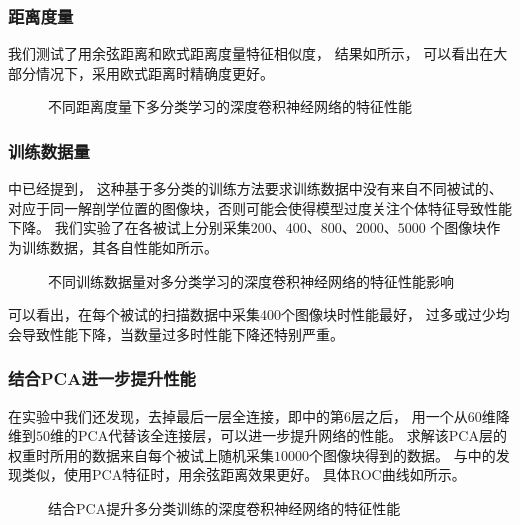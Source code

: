 \subsubsection{距离度量}
我们测试了用余弦距离和欧式距离度量特征相似度，
结果如所示，
可以看出在大部分情况下，采用欧式距离时精确度更好。

\begin{figure}[h!]
    \caption{不同距离度量下多分类学习的深度卷积神经网络的特征性能}
    \label{fig:expr:curve:clsfy:measure}
\end{figure}

\subsubsection{训练数据量}
中已经提到，
这种基于多分类的训练方法要求训练数据中没有来自不同被试的、
对应于同一解剖学位置的图像块，否则可能会使得模型过度关注个体特征导致性能下降。
我们实验了在各被试上分别采集$200$、$400$、$800$、$2000$、$5000$
个图像块作为训练数据，其各自性能如所示。
\begin{figure}[h!]
    \caption{不同训练数据量对多分类学习的深度卷积神经网络的特征性能影响}
    \label{fig:expr:curve:clsfy:datasize}
\end{figure}

可以看出，在每个被试的扫描数据中采集$400$个图像块时性能最好，
过多或过少均会导致性能下降，当数量过多时性能下降还特别严重。

\subsubsection{结合PCA进一步提升性能\label{sec:expr:clsfy:pca}}
在实验中我们还发现，去掉最后一层全连接，即中的第6层之后，
用一个从$60$维降维到$50$维的PCA代替该全连接层，可以进一步提升网络的性能。
求解该PCA层的权重时所用的数据来自每个被试上随机采集$10000$个图像块得到的数据。
与中的发现类似，使用PCA特征时，用余弦距离效果更好。
具体ROC曲线如所示。

\begin{figure}[h!]
    \centering
    \caption{结合PCA提升多分类训练的深度卷积神经网络的特征性能}
    \label{fig:expr:curve:clsfy:pca}
\end{figure}


